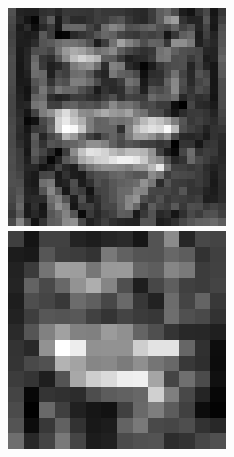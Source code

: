 \begin{figure}[H]
\endminipage
\vspace{0.15cm}
  \includegraphics[width=\linewidth]{imgs/down4.png}
\endminipage\hfill
{}
  \includegraphics[width=\linewidth]{imgs/middle1.png}

\end{figure}
